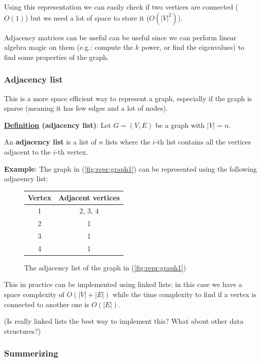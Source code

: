 \documentclass[12pt]{extarticle}
\begin{document}
Using this representation we can easily check if two vertices are connected ($O(1)$) but we need a lot of space to store it ($O(|V|^2)$).

Adjacency matrices can be useful can be useful since we can perform linear algebra magic on them
(e.g.: compute the $k$ power, or find the eigenvalues) to find some properties of the graph.

\subsubsection{Adjacency list}

This is a more space efficient way to represent a graph, especially if the graph is sparse (meaning it has few edges and a lot of nodes).

\textbf{\underline{Definition} (adjacency list)}:
Let $G = (V, E)$ be a graph with $|V| = n$.

An \textbf{adjacency list} is a list of $n$ lists where the $i$-th list contains all the vertices adjacent to the $i$-th vertex.

\textbf{Example}: The graph in (\ref{fig:repr:graph1}) can be represented using the following adjacency list:

\begin{figure}[H]
    \centering
    \begin{tabular}{c|c}
        Vertex & Adjacent vertices \\
        \hline
        1      & 2, 3, 4           \\
        2      & 1                 \\
        3      & 1                 \\
        4      & 1
    \end{tabular}
    \caption{The adjacency list of the graph in (\ref{fig:repr:graph1})}
    \label{fig:repr:adjlist1}
\end{figure}

This in practice can be implemented using linked lists: in this case we have a space complexity of $O(|V| + |E|)$ while the time complexity to find if a vertex is connected to another one is $O(|E|)$.

(Is really linked lists the best way to implement this? What about other data structures?)

\subsubsection{Summerizing}
\end{document}
